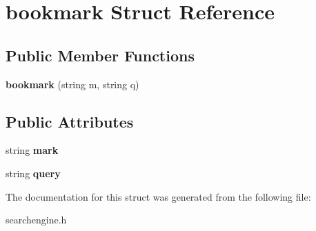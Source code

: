 \section{bookmark Struct Reference}
\label{structbookmark}
\subsection*{Public Member Functions}
\begin{DoxyCompactItemize}
\item 
{\bfseries bookmark} (string m, string q)\label{structbookmark_ad1783bc7b182c5af9e42411cac3cc08f}

\end{DoxyCompactItemize}
\subsection*{Public Attributes}
\begin{DoxyCompactItemize}
\item 
string {\bfseries mark}\label{structbookmark_a872f359ce12f82e6d906ae951840f5ac}

\item 
string {\bfseries query}\label{structbookmark_abc6d931aa6d6d2c14e906277fc5bdd77}

\end{DoxyCompactItemize}


The documentation for this struct was generated from the following file\+:\begin{DoxyCompactItemize}
\item 
searchengine.\+h\end{DoxyCompactItemize}

